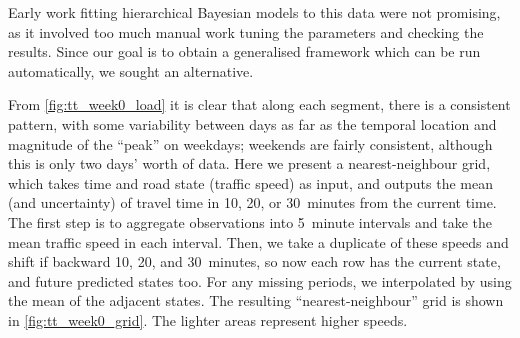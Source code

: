 Early work fitting hierarchical Bayesian models to this data were not promising, as it involved too much manual work tuning the parameters and checking the results. Since our goal is to obtain a generalised framework which can be run automatically, we sought an alternative.

From \cref{fig:tt_week0_load} it is clear that along each segment, there is a consistent pattern, with some variability between days as far as the temporal location and magnitude of the ``peak'' on weekdays; weekends are fairly consistent, although this is only two days' worth of data. Here we present a nearest-neighbour grid, which takes time and road state (traffic speed) as input, and outputs the mean (and uncertainty) of travel time in 10, 20, or 30~minutes from the current time. The first step is to aggregate observations into 5~minute intervals and take the mean traffic speed in each interval. Then, we take a duplicate of these speeds and shift if backward 10, 20, and 30~minutes, so now each row has the current state, and future predicted states too. For any missing periods, we interpolated by using the mean of the adjacent states. The resulting ``nearest-neighbour'' grid is shown in \cref{fig:tt_week0_grid}. The lighter areas represent higher speeds.







